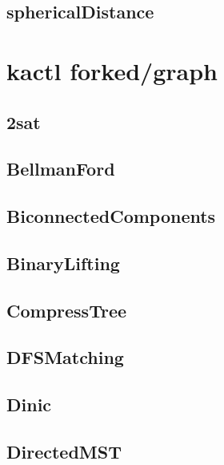 \subsection{sphericalDistance}
\raggedbottom
\hrulefill

\section{kactl forked/graph}
\subsection{2sat}
\raggedbottom
\hrulefill
\subsection{BellmanFord}
\raggedbottom
\hrulefill
\subsection{BiconnectedComponents}
\raggedbottom
\hrulefill
\subsection{BinaryLifting}
\raggedbottom
\hrulefill
\subsection{CompressTree}
\raggedbottom
\hrulefill
\subsection{DFSMatching}
\raggedbottom
\hrulefill
\subsection{Dinic}
\raggedbottom
\hrulefill
\subsection{DirectedMST}
\raggedbottom
\hrulefill
